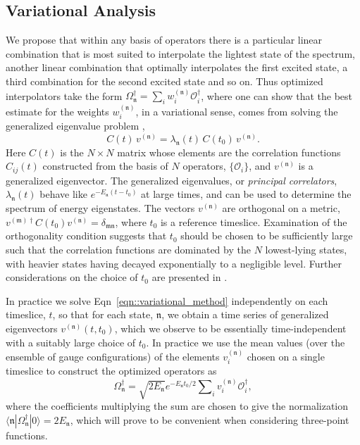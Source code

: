 \documentclass[twocolumn,amsmath,amssymb,prd,10pt,floatfix, 
superscriptaddress,nofootinbib, showpacs, preprintnumbers]{revtex4-1}
\newcommand{\estate}[1]{\ensuremath{\mathfrak{#1}}}
\begin{document}
\subsection{Variational Analysis \label{ssec::two_points_variational}}

We propose that within any basis of operators there is a particular linear combination that is most suited to interpolate the lightest state of the spectrum, another linear combination that optimally interpolates the first excited state, a third combination for the second excited state and so on. Thus optimized interpolators take the form $\Omega^\dagger_\estate{n} = \sum_{i}w_i^{(\estate{n})} \mathcal{O}_i^\dagger$, where one can show that the best estimate for the weights $w_i^{(\estate{n})}$, in a variational sense,  comes from solving the generalized eigenvalue problem \cite{Michael:1985ne, Luscher:1990ck, Dudek:2007wv, Blossier:2009kd},
\begin{equation}
C(t) \, v^{(\estate{n})} = \lambda_\estate{n}(t) \, C(t_0)\,  v^{(\estate{n})}. \label{eqn::variational_method}
\end{equation}
Here $C(t)$ is the $N\times N$ matrix whose elements are the correlation functions $C_{ij}(t)$ constructed from the basis of $N$ operators, $\{ \mathcal{O}_i \}$, and $v^{(\estate{n})}$ is a generalized eigenvector. The generalized eigenvalues, or \emph{principal correlators}, ${\lambda_\estate{n}(t)}$ behave like ${e^{-E_\estate{n} (t-t_0)}    }$ at large times, and can be used to determine the spectrum of energy eigenstates. The vectors $ v^{(\estate{n})}$ are orthogonal on a metric, $ v^{(\estate{m})\dagger}C(t_0)  v^{(\estate{n})} = \delta_{\estate{m}\estate{n}}$, where $t_0$ is a reference timeslice. Examination of the orthogonality condition suggests that $t_0$ should be chosen to be sufficiently large such that the correlation functions are dominated by the $N$ lowest-lying states, with heavier states having decayed exponentially to a negligible level. Further considerations on the choice of $t_0$ are presented in \cite{Dudek:2007wv,Blossier:2009kd}.

In practice we solve Eqn~\ref{eqn::variational_method} independently on each timeslice, $t$, so that for each state, $\mathfrak{n}$, we obtain a time series of generalized eigenvectors $v^{(\mathfrak{n})}(t,t_0)$, which we observe to be essentially time-independent with a suitably large choice of $t_0$. In practice we use the mean values (over the ensemble of gauge configurations) of the elements $v^{(\mathfrak{n})}_i$ chosen on a single timeslice to construct the optimized operators as
\begin{equation}
\Omega_\estate{n}^\dagger = \sqrt{2E_\estate{n}} e^{-E_\estate{n}t_0/2} \sum\nolimits_i v^{(\estate{n})}_i \mathcal{O}_i^\dagger, \label{optimized_definition}
\end{equation} 
where the coefficients multiplying the sum are chosen to give the normalization $\langle \estate{n} | \Omega^\dagger_\estate{n} | 0 \rangle = 2E_\estate{n}$, which will prove to be convenient when considering three-point functions.
\end{document}
